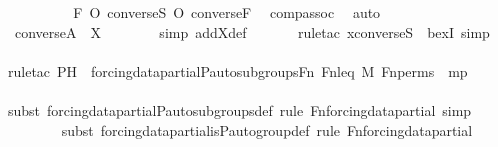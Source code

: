 \begin{isabellebody}
\ \ \ \ \isamarkupfalse%
\ \isamarkupfalse%
\ {\isachardoublequoteopen}{\isachardot}{\kern0pt}{\isachardot}{\kern0pt}{\isachardot}{\kern0pt}\ {\isacharequal}{\kern0pt}\ F\ O\ converse{\isacharparenleft}{\kern0pt}S{\isacharparenright}{\kern0pt}\ O\ converse{\isacharparenleft}{\kern0pt}F{\isacharparenright}{\kern0pt}{\isachardoublequoteclose}\ \isamarkupfalse%
\ comp{\isacharunderscore}{\kern0pt}assoc\ \isamarkupfalse%
\ auto\isanewline
\ \ \ \ \isamarkupfalse%
\ \isamarkupfalse%
\ {\isachardoublequoteopen}converse{\isacharparenleft}{\kern0pt}A{\isacharparenright}{\kern0pt}\ {\isasymin}\ X{\isachardoublequoteclose}\ \isanewline
\ \ \ \ \ \ \isamarkupfalse%
{\isacharparenleft}{\kern0pt}simp\ add{\isacharcolon}{\kern0pt}X{\isacharunderscore}{\kern0pt}def{\isacharparenright}{\kern0pt}\isanewline
\ \ \ \ \ \ \isamarkupfalse%
{\isacharparenleft}{\kern0pt}rule{\isacharunderscore}{\kern0pt}tac\ x{\isacharequal}{\kern0pt}{\isachardoublequoteopen}converse{\isacharparenleft}{\kern0pt}S{\isacharparenright}{\kern0pt}{\isachardoublequoteclose}\ \ bexI{\isacharcomma}{\kern0pt}\ simp{\isacharparenright}{\kern0pt}\isanewline
\ \ \ \ \ \ \isamarkupfalse%
{\isacharparenleft}{\kern0pt}rule{\isacharunderscore}{\kern0pt}tac\ P{\isacharequal}{\kern0pt}{\isachardoublequoteopen}H\ {\isasymin}\ forcing{\isacharunderscore}{\kern0pt}data{\isacharunderscore}{\kern0pt}partial{\isachardot}{\kern0pt}P{\isacharunderscore}{\kern0pt}auto{\isacharunderscore}{\kern0pt}subgroups{\isacharparenleft}{\kern0pt}Fn{\isacharcomma}{\kern0pt}\ Fn{\isacharunderscore}{\kern0pt}leq{\isacharcomma}{\kern0pt}\ M{\isacharcomma}{\kern0pt}\ Fn{\isacharunderscore}{\kern0pt}perms{\isacharparenright}{\kern0pt}{\isachardoublequoteclose}\ \ mp{\isacharparenright}{\kern0pt}\isanewline
\ \ \ \ \ \ \ \isamarkupfalse%
{\isacharparenleft}{\kern0pt}subst\ forcing{\isacharunderscore}{\kern0pt}data{\isacharunderscore}{\kern0pt}partial{\isachardot}{\kern0pt}P{\isacharunderscore}{\kern0pt}auto{\isacharunderscore}{\kern0pt}subgroups{\isacharunderscore}{\kern0pt}def{\isacharcomma}{\kern0pt}\ rule\ Fn{\isacharunderscore}{\kern0pt}forcing{\isacharunderscore}{\kern0pt}data{\isacharunderscore}{\kern0pt}partial{\isacharcomma}{\kern0pt}\ simp{\isacharparenright}{\kern0pt}\isanewline
\ \ \ \ \ \ \ \isamarkupfalse%
{\isacharparenleft}{\kern0pt}subst\ forcing{\isacharunderscore}{\kern0pt}data{\isacharunderscore}{\kern0pt}partial{\isachardot}{\kern0pt}is{\isacharunderscore}{\kern0pt}P{\isacharunderscore}{\kern0pt}auto{\isacharunderscore}{\kern0pt}group{\isacharunderscore}{\kern0pt}def{\isacharcomma}{\kern0pt}\ rule\ Fn{\isacharunderscore}{\kern0pt}forcing{\isacharunderscore}{\kern0pt}data{\isacharunderscore}{\kern0pt}partial{\isacharparenright}{\kern0pt}\isanewline

\end{isabellebody}
